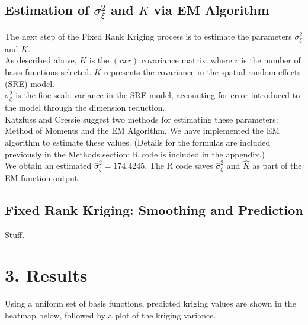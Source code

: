 \documentclass[11pt]{article}
\begin{document}
\subsection{Estimation of $\sigma^2_{\xi}$ and $K$ via EM Algorithm}

The next step of the Fixed Rank Kriging process is to estimate the parameters $\sigma^2_{\xi}$ and $K$.  \\

As described above, $K$ is the $(r x r)$ covariance matrix, where $r$ is the number of basis functions selected.  $K$ represents the covariance in the spatial-random-effects (SRE) model.\\

$\sigma^2_{\xi}$ is the fine-scale variance in the SRE model, accounting for error introduced to the model through the dimension reduction. \\

Katzfuss and Cressie suggest two methods for estimating these parameters: Method of Moments and the EM Algorithm.  We have implemented the EM algorithm to estimate these values.  (Details for the formulas are included previously in the Methods section; R code is included in the appendix.)\\

We obtain an estimated $\hat{\sigma}^2_{\xi} = 174.4245$.  The R code saves $\hat{\sigma}^2_{\xi}$ and $\hat{K}$ as part of the EM function output.\\

\subsection{Fixed Rank Kriging: Smoothing and Prediction}

Stuff.\\


\newpage
\section{3. Results}

Using a uniform set of basis functions, predicted kriging values are shown in the heatmap below, followed by a plot of the kriging variance. \\
\end{document}

